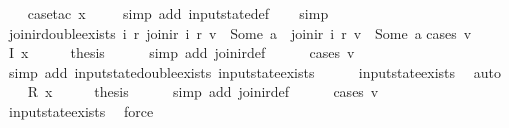 \begin{isabellebody}
\ \ \isamarkupfalse%
\ {\isacharparenleft}case{\isacharunderscore}tac\ x{\isacharparenright}\isanewline
\ \ \ \isamarkupfalse%
\ {\isacharparenleft}simp\ add{\isacharcolon}\ input{}state{\isacharunderscore}def{\isacharparenright}\isanewline
\ \ \isamarkupfalse%
\ simp%
\endisatagproof
{\isafoldproof}%
%
\isadelimproof
\isanewline
%
\endisadelimproof
\isanewline
{}\isamarkupfalse%
\ join{\isacharunderscore}ir{\isacharunderscore}double{\isacharunderscore}exists{\isacharcolon}\ {\isachardoublequoteopen}{\isasymexists}i\ r{\isachardot}\ join{\isacharunderscore}ir\ i\ r\ v\ {\isacharequal}\ Some\ a\ {\isasymand}\ join{\isacharunderscore}ir\ i\ r\ v{\isacharprime}\ {\isacharequal}\ Some\ a{\isachardoublequoteclose}\isanewline
%
\isadelimproof
%
\endisadelimproof
%
\isatagproof
{}\isamarkupfalse%
{\isacharparenleft}cases\ v{\isacharparenright}\isanewline
\ \ \isamarkupfalse%
\ {\isacharparenleft}I\ x{}{\isacharparenright}\isanewline
\ \ \isamarkupfalse%
\ \isamarkupfalse%
\ {\isacharquery}thesis\isanewline
\ \ \ \ \isamarkupfalse%
\ {\isacharparenleft}simp\ add{\isacharcolon}\ join{\isacharunderscore}ir{\isacharunderscore}def{\isacharparenright}\isanewline
\ \ \ \ \isamarkupfalse%
\ {\isacharparenleft}cases\ v{\isacharprime}{\isacharparenright}\isanewline
\ \ \ \ \ \isamarkupfalse%
\ {\isacharparenleft}simp\ add{\isacharcolon}\ input{}state{\isacharunderscore}double{\isacharunderscore}exists\ input{}state{\isacharunderscore}exists{\isacharparenright}\isanewline
\ \ \ \ \isamarkupfalse%
\ input{}state{\isacharunderscore}exists\ \isamarkupfalse%
\ auto\isanewline
{}\isamarkupfalse%
\isanewline
\ \ \isamarkupfalse%
\ {\isacharparenleft}R\ x{}{\isacharparenright}\isanewline
\ \ \isamarkupfalse%
\ \isamarkupfalse%
\ {\isacharquery}thesis\isanewline
\ \ \ \ \isamarkupfalse%
\ {\isacharparenleft}simp\ add{\isacharcolon}\ join{\isacharunderscore}ir{\isacharunderscore}def{\isacharparenright}\isanewline
\ \ \ \ \isamarkupfalse%
\ {\isacharparenleft}cases\ v{\isacharprime}{\isacharparenright}\isanewline
\ \ \ \ \isamarkupfalse%
\ input{}state{\isacharunderscore}exists\ \isamarkupfalse%
\ force\isanewline
\ \ \ \ \isamarkupfalse%

\end{isabellebody}
